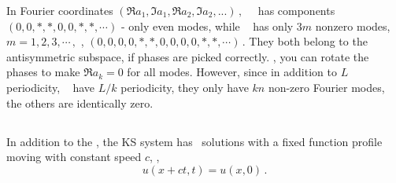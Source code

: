 In Fourier coordinates
\(
(\Re a_1, \Im a_1, \Re a_2, \Im a_2, ...)
\,,
\)
 ~\eqv\ has components \(
(0, 0, *, *, 0, 0, *, *,\cdots)
\) - only even modes, while ~{\eqv}
has only $3m$ nonzero modes,
\(
m = 1, 2, 3, \cdots\,,
\)
\ie,
\(
(0,0,0,0,*,*,0,0,0,0,*,*,\cdots)
\,.
\)
They both belong to the antisymmetric subspace, if phases are picked
correctly.
\ie,
you can rotate the phases to make
\( \Re a_k = 0 \)
for all modes. However,
since in addition to
$L$ periodicity, ~{\eqva} have
$L/k$ periodicity, they only have
$kn$ non-zero Fourier modes, the others are identically zero.

\subsection{\Reqva}

In addition to the \eqva, the KS system has \reqv\ solutions 
 with a fixed function profile
moving with constant speed $c$, \ie,
\[ u(x+ct,t) = u(x, 0)\,.
\]

